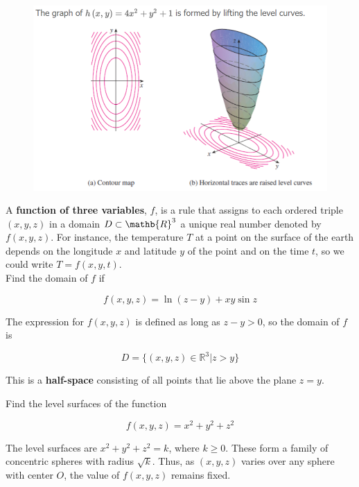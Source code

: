         \begin{figure}[hbt!]
            \centering
            \includegraphics[scale = 0.75]{Resources/14.1_Lifting_Level_Curves}
        \end{figure}

        A \textbf{function of three variables}, $f$, is a rule that assigns to each ordered triple $(x,y,z)$ in a domain $D\subset \mathb{R}^3$ a unique real number denoted by $f(x,y,z)$. For instance, the temperature
        $T$ at a point on the surface of the earth depends on the longitude $x$ and latitude $y$ of the point and on the time $t$, so we could write $T=f(x,y,t)$. \\

        \textit{} Find the domain of $f$ if

        \[
            f(x,y,z) = \ln{(z-y)} + xy\sin{z}
        \]

        The expression for $f(x,y,z)$ is defined as long as $z-y>0$, so the domain of $f$ is

        \[
            D = \{(x,y,z) \in \mathbb{R}^3 | z > y\}
        \]

        This is a \textbf{half-space} consisting of all points that lie above the plane $z=y$.

        \textit{} Find the level surfaces of the function

        \[
            f(x,y,z) = x^{2} + y^2 + z^2
        \]

        The level surfaces are $x^2 + y^2 + z^2 = k$, where $k\geq 0$. These form a family of concentric spheres with radius $\sqrt{k}$. Thus, as $(x,y,z)$ varies over any sphere with center $O$, the value of
        $f(x,y,z)$ remains fixed.

